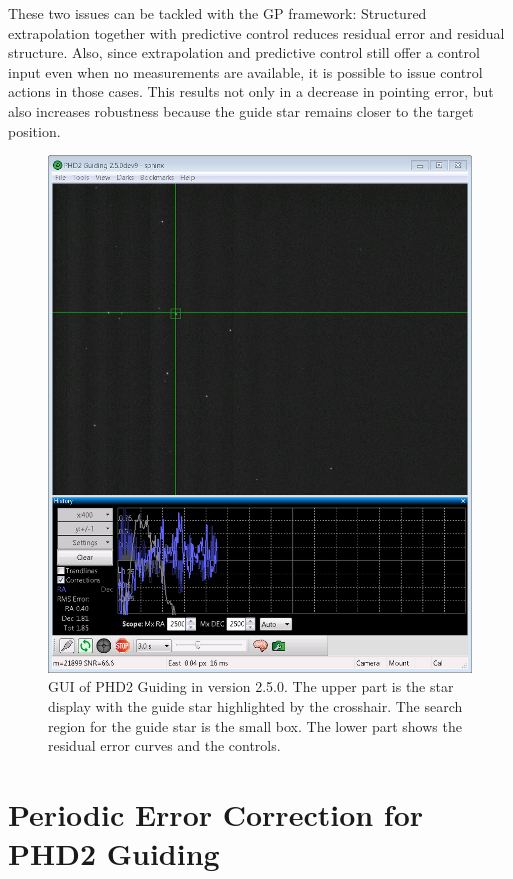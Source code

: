 These two issues can be tackled with the GP framework: Structured extrapolation
together with predictive control reduces residual error and residual structure.
Also, since extrapolation and predictive control still offer a control input
even when no measurements are available, it is possible to issue control actions
in those cases. This results not only in a decrease in pointing error, but also
increases robustness because the guide star remains closer to the target
position.

\begin{figure}
\includegraphics[width=\textwidth]{img/PHD2_screenshot_crop.png}
\caption[GUI of PHD2 Guiding in version 2.5.0.]{GUI of PHD2 Guiding in
version 2.5.0. The upper part is the star display with the guide star
highlighted by the crosshair. The search region for the guide star is the small
box. The lower part shows the residual error curves and the controls.}
\label{fig:PHD2}
\end{figure}

\section{Periodic Error Correction for PHD2 Guiding}
\label{sec:algorithm-changes}

